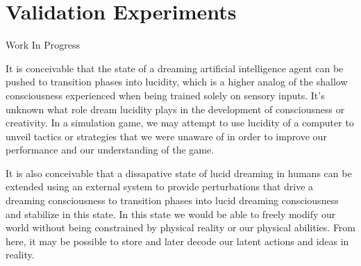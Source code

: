 \documentclass{article}
\begin{document}





\section{Validation Experiments}

Work In Progress 

It is conceivable that the state of a dreaming artificial intelligence agent can be pushed to transition phases into lucidity, which is a higher analog of the shallow consciousness experienced when being trained solely on sensory inputs. It's unknown what role dream lucidity plays in the development of consciousness or creativity. In a simulation game, we may attempt to use lucidity of a computer to unveil tactics or strategies that we were unaware of in order to improve our performance and our understanding of the game. 

It is also conceivable that a dissapative state of lucid dreaming in humans can be extended using an external system to provide perturbations that drive a dreaming consciousness to transition phases into lucid dreaming consciousness and stabilize in this state. In this state we would be able to freely modify our world without being constrained by physical reality or our physical abilities. From here, it may be possible to store and later decode our latent actions and ideas in reality. 


\end{document}
